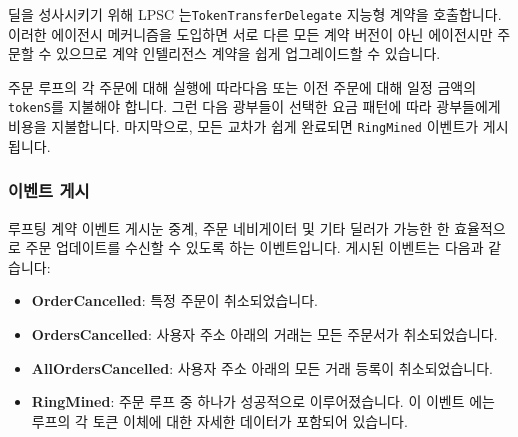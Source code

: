 \documentclass{article}
\makeatletter
\newenvironment{figurehere}
{\def\@captype{figure}}
\makeatother
\begin{document}
\begin{multicols}{2}
\begin{center}
	\begin{figurehere}
		\centering
		
	\label{fig:settlement}
	\end{figurehere}
\end{center}

\indent 딜을 성사시키기 위해 LPSC 는\verb|TokenTransferDelegate| 지능형 계약을 호출합니다. 이러한 에이전시 메커니즘을 도입하면 서로 다른 모든 계약 버전이 아닌 에이전시만 주문할 수 있으므로 계약 인텔리전스 계약을 쉽게 업그레이드할 수 있습니다.

\indent 주문 루프의 각 주문에 대해 실행에 따라다음 또는 이전 주문에 대해 일정 금액의 \verb|tokenS|를 지불해야 합니다. 그런 다음 광부들이 선택한 요금 패턴에 따라 광부들에게 비용을 지불합니다. 마지막으로, 모든 교차가 쉽게 완료되면 \verb|RingMined| 이벤트가 게시됩니다.

\subsubsection{이벤트 게시\label{sec:events}}

\indent 루프팅 계약 이벤트 게시눈 중계, 주문 네비게이터 및 기타 딜러가 가능한 한 효율적으로 주문 업데이트를 수신할 수 있도록 하는 이벤트입니다. 게시된 이벤트는 다음과 같습니다:

\begin{itemize}
	\item \textbf{OrderCancelled}: 특정 주문이 취소되었습니다.
	\item \textbf{OrdersCancelled}: 사용자 주소 아래의 거래는 모든 주문서가 취소되었습니다.
	\item \textbf{AllOrdersCancelled}: 사용자 주소 아래의 모든 거래 등록이 취소되었습니다.
	\item \textbf{RingMined}: 주문 루프 중 하나가 성공적으로 이루어졌습니다. 이 이벤트 에는 루프의 각 토큰 이체에 대한 자세한 데이터가 포함되어 있습니다.
\end{itemize}



\end{multicols}
\end{document}
